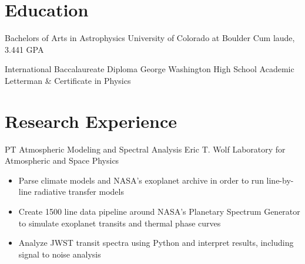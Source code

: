 \documentclass[10pt]{article} %
\begin{document}
\begin{paracol}{2}
\section{Education}




     
    {}
    {Bachelors of Arts in Astrophysics} %
    {University of Colorado at Boulder} %
    {Cum laude, 3.441 GPA} %
    {}
    
    
    {}
    {International Baccalaureate Diploma} %
    {George Washington High School} %
    {Academic Letterman \& Certificate in Physics} %
    {}


\medskip
\section{Research Experience}

{PT} %
{Atmospheric Modeling and Spectral Analysis} %
{Eric T. Wolf} %
{Laboratory for Atmospheric and Space Physics}
{\begin{itemize}
\setlength\itemsep{0.1em}
\item Parse climate models and NASA's exoplanet archive in order to run line-by-line radiative transfer models
\item Create 1500 line data pipeline around NASA's Planetary Spectrum Generator to simulate exoplanet transits and thermal phase curves
\item Analyze JWST transit spectra using Python and interpret results, including signal to noise analysis
\end{itemize}
}


\end{paracol}
\end{document}

